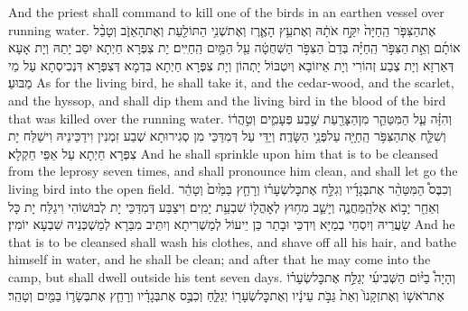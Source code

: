 {And the priest shall command to kill one of the birds in an earthen vessel over running water.}{}
{אֶת\maqqaf הַצִּפֹּ֤ר הַֽחַיָּה֙ יִקַּ֣ח אֹתָ֔הּ וְאֶת\maqqaf עֵ֥ץ הָאֶ֛רֶז וְאֶת\maqqaf שְׁנִ֥י הַתּוֹלַ֖עַת וְאֶת\maqqaf הָאֵזֹ֑ב וְטָבַ֨ל אוֹתָ֜ם וְאֵ֣ת \legarmeh  הַצִּפֹּ֣ר הַֽחַיָּ֗ה בְּדַם֙ הַצִּפֹּ֣ר הַשְּׁחֻטָ֔ה עַ֖ל הַמַּ֥יִם הַֽחַיִּֽים׃}
{יָת צִפְּרָא חַיְתָא יִסַּב יָתַהּ וְיָת אָעָא דְּאַרְזָא וְיָת צְבַע זְהוֹרִי וְיָת אֵיזוֹבָא וְיִטְבּוֹל יָתְהוֹן וְיָת צִפְּרָא חַיְתָא בִּדְמָא דְּצִפְּרָא דִּנְכִיסְתָא עַל מֵי מַבּוּעַ׃}
{As for the living bird, he shall take it, and the cedar-wood, and the scarlet, and the hyssop, and shall dip them and the living bird in the blood of the bird that was killed over the running water.}{}
{וְהִזָּ֗ה עַ֧ל הַמִּטַּהֵ֛ר מִן\maqqaf הַצָּרַ֖עַת שֶׁ֣בַע פְּעָמִ֑ים וְטִ֣הֲר֔וֹ וְשִׁלַּ֛ח אֶת\maqqaf הַצִּפֹּ֥ר הַֽחַיָּ֖ה עַל\maqqaf פְּנֵ֥י הַשָּׂדֶֽה׃}
{וְיַדֵּי עַל דְּמִדַּכֵּי מִן סְגִירוּתָא שְׁבַע זִמְנִין וִידַכֵּינֵיהּ וִישַׁלַּח יָת צִפְּרָא חַיְתָא עַל אַפֵּי חַקְלָא׃}
{And he shall sprinkle upon him that is to be cleansed from the leprosy seven times, and shall pronounce him clean, and shall let go the living bird into the open field.}{}
{וְכִבֶּס֩ הַמִּטַּהֵ֨ר אֶת\maqqaf בְּגָדָ֜יו וְגִלַּ֣ח אֶת\maqqaf כׇּל\maqqaf שְׂעָר֗וֹ וְרָחַ֤ץ בַּמַּ֙יִם֙ וְטָהֵ֔ר וְאַחַ֖ר יָב֣וֹא אֶל\maqqaf הַֽמַּחֲנֶ֑ה וְיָשַׁ֛ב מִח֥וּץ לְאׇהֳל֖וֹ שִׁבְעַ֥ת יָמִֽים׃}
{וִיצַבַּע דְּמִדַּכֵּי יָת לְבוּשׁוֹהִי וִיגַלַּח יָת כָּל שַׂעֲרֵיהּ וְיִסְחֵי בְמַיָּא וְיִדְכֵּי וּבָתַר כֵּן יֵיעוֹל לְמַשְׁרִיתָא וְיִתֵּיב מִבַּרָא לְמַשְׁכְּנֵיהּ שִׁבְעָא יוֹמִין׃}
{And he that is to be cleansed shall wash his clothes, and shave off all his hair, and bathe himself in water, and he shall be clean; and after that he may come into the camp, but shall dwell outside his tent seven days.}{}
{וְהָיָה֩ בַיּ֨וֹם הַשְּׁבִיעִ֜י יְגַלַּ֣ח אֶת\maqqaf כׇּל\maqqaf שְׂעָר֗וֹ אֶת\maqqaf רֹאשׁ֤וֹ וְאֶת\maqqaf זְקָנוֹ֙ וְאֵת֙ גַּבֹּ֣ת עֵינָ֔יו וְאֶת\maqqaf כׇּל\maqqaf שְׂעָר֖וֹ יְגַלֵּ֑חַ וְכִבֶּ֣ס אֶת\maqqaf בְּגָדָ֗יו וְרָחַ֧ץ אֶת\maqqaf בְּשָׂר֛וֹ בַּמַּ֖יִם וְטָהֵֽר׃}
